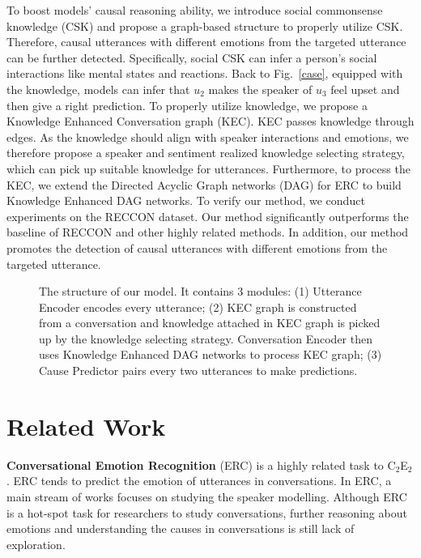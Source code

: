 \documentclass{article}
\begin{document}
To boost models' causal reasoning ability, we introduce social commonsense knowledge (CSK) \cite{ATOMIC2020} and propose a graph-based structure to properly utilize CSK. Therefore, causal utterances with different emotions from the targeted utterance can be further detected. Specifically, social CSK can infer a person's social interactions like mental states and reactions. Back to Fig.~\ref{case}, equipped with the knowledge, models can infer that $u_2$ makes the speaker of $u_3$ feel upset and then give a right prediction. To properly utilize knowledge, we propose a Knowledge Enhanced Conversation graph (KEC). KEC passes knowledge through edges. As the knowledge should align with speaker interactions and emotions, we therefore propose a speaker and sentiment realized knowledge selecting strategy, which can pick up suitable knowledge for utterances. Furthermore, to process the KEC, we extend the Directed Acyclic Graph networks (DAG) for ERC \cite{DAG} to build Knowledge Enhanced DAG networks. To verify our method, we conduct experiments on the RECCON dataset. Our method significantly outperforms the baseline of RECCON and other highly related methods. In addition, our method promotes the detection of causal utterances with different emotions from the targeted utterance. 



\begin{figure*}
    \centering
    \caption{The structure of our model. It contains 3 modules: (1) Utterance Encoder encodes every utterance; (2) KEC graph is constructed from a conversation and knowledge attached in KEC graph is picked up by the knowledge selecting strategy. Conversation Encoder then uses Knowledge Enhanced DAG networks to process KEC graph; (3) Cause Predictor pairs every two utterances to make predictions. }
    \vspace{-0.2cm}
    \label{model}
\end{figure*}

\section{Related Work}

\textbf{Conversational Emotion Recognition} (ERC) is a highly related task to C$_2$E$_2$. ERC tends to predict the emotion of utterances in conversations. In ERC, a main stream of works \cite{DialogueRNN,DialogueGCN,DialogXL} focuses on studying the speaker modelling. Although ERC is a hot-spot task for researchers to study conversations, further reasoning about emotions and understanding the causes in conversations is still lack of exploration. 
\end{document}
